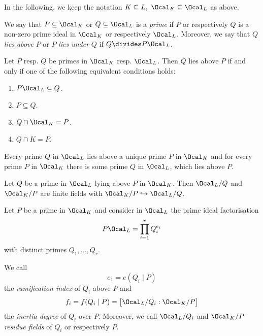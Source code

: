 \begin{notat*}
	In the following, we keep the notation \( K \subseteq L,\ \Ocal_K \subseteq \Ocal_L \) as above.
\end{notat*}

\begin{defn*}[Primes]
	We say that \( P \subseteq \Ocal_K \) or \( Q \subseteq \Ocal_L \) is a \emph{prime} if \( P \) or respectively \( Q \) is a non-zero prime ideal in \( \Ocal_K \) or respectively \( \Ocal_L \).
	Moreover, we say that \( Q \) \emph{lies above} \( P \) or \( P \) \emph{lies under} \( Q \) if \( Q \divides P\Ocal_L \).
\end{defn*}

\begin{lem}
	Let \( P \) resp. \( Q \) be primes in \( \Ocal_K \) resp. \( \Ocal_L \).
	Then \( Q \) lies above \( P \) if and only if one of the following equivalent conditions holds:
	\begin{enumerate}
		\item \( P \Ocal_L \subseteq Q \).
		\item \( P \subseteq Q \).
		\item \( Q \cap \Ocal_K = P \).
		\item \( Q \cap K = P \).
	\end{enumerate}
\end{lem}

\begin{thmn}
	Every prime \( Q \) in \( \Ocal_L \) lies above a unique prime \( P \) in \( \Ocal_K \) and for every prime \( P \) in \( \Ocal_K \) there is some prime \( Q \) in \( \Ocal_L \), which lies above \( P \).
\end{thmn}

\begin{lem}
	Let \( Q \) be a prime in \( \Ocal_L \) lying above \( P \) in \( \Ocal_K \).
	Then \( \Ocal_L/Q \) and \( \Ocal_K/P \) are finite fields with \( \Ocal_K/P \hookrightarrow \Ocal_L/Q \).
\end{lem}

Let \( P \) be a prime in \( \Ocal_K \) and consider in \( \Ocal_L \) the prime ideal factorisation
\[ P\Ocal_L = \prod_{i=1}^{r} Q_i^{e_i} \]
with distinct primes \( Q_1, \dotsc, Q_r \).

\begin{defn*}
	We call
	\[ e_1 = e(Q_i \mid P) \]
	the \emph{ramification index} of \( Q_i \) above \( P \) and 
	\[ f_i = f(Q_i \mid P) = \big[ \Ocal_L/Q_i : \Ocal_K/P \big] \]
	the \emph{inertia degree} of \( Q_i \) over \( P \).
	Moreover, we call \( \Ocal_L/Q_i \) and \( \Ocal_K/P \) \emph{residue fields} of \( Q_i \) or respectively \( P \).
\end{defn*}

